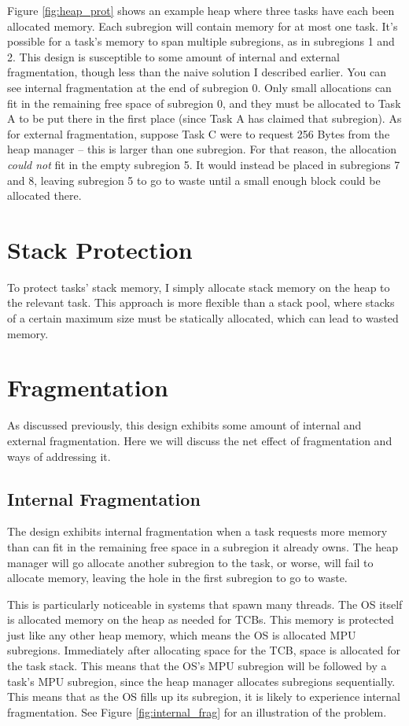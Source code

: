 Figure \ref{fig:heap_prot} shows an example heap where three tasks have each been allocated memory. Each subregion will contain memory for at most one task. It's possible for a task's memory to span multiple subregions, as in subregions 1 and 2. This design is susceptible to some amount of internal and external fragmentation, though less than the naive solution I described earlier. You can see internal fragmentation at the end of subregion 0. Only small allocations can fit in the remaining free space of subregion 0, and they must be allocated to Task A to be put there in the first place (since Task A has claimed that subregion). As for external fragmentation, suppose Task C were to request 256 Bytes from the heap manager -- this is larger than one subregion. For that reason, the allocation \textit{could not} fit in the empty subregion 5. It would instead be placed in subregions 7 and 8, leaving subregion 5 to go to waste until a small enough block could be allocated there.

\section{Stack Protection}

To protect tasks' stack memory, I simply allocate stack memory on the heap to the relevant task. This approach is more flexible than a stack pool, where stacks of a certain maximum size must be statically allocated, which can lead to wasted memory.

\section{Fragmentation}

As discussed previously, this design exhibits some amount of internal and external fragmentation.
Here we will discuss the net effect of fragmentation and ways of addressing it.

\subsection{Internal Fragmentation}

The design exhibits internal fragmentation when a task requests more memory than can fit in the remaining free space in a subregion it already owns. The heap manager will go allocate another subregion to the task, or worse, will fail to allocate memory, leaving the hole in the first subregion to go to waste.

This is particularly noticeable in systems that spawn many threads. The OS itself is allocated memory on the heap as needed for TCBs. This memory is protected just like any other heap memory, which means the OS is allocated MPU subregions. Immediately after allocating space for the TCB, space is allocated for the task stack. This means that the OS's MPU subregion will be followed by a task's MPU subregion, since the heap manager allocates subregions sequentially. This means that as the OS fills up its subregion, it is likely to experience internal fragmentation. See Figure \ref{fig:internal_frag} for an illustration of the problem.

